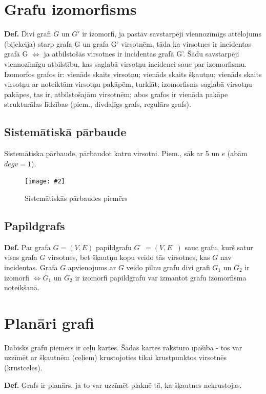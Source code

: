 \documentclass{article}
\newcommand{\illustration}[3]{
	\begin{figure}[H]
		\centering	
		\texttt{[image: \#2]}
		\caption{#3}
	\end{figure}
}
\begin{document}
\section{Grafu izomorfisms}

\textbf{Def.}  Divi grafi $G$ un $G'$ ir izomorfi, ja pastāv savstarpēji viennozīmīgs attēlojums (bijekcija) starp grafa G un grafa G' virsotnēm, tāda ka virsotnes ir incidentas grafā G $\Leftrightarrow$ ja atbilstošās virsotnes ir incidentas grafā G'.  Šādu savstarpēji viennozīmīgu atbilstību, kas saglabā virsotņu incidenci sauc par izomorfismu.  
Izomorfos grafos ir: vienāds skaits virsotņu; vienāds skaits šķautņu; vienāds skaits virsotņu ar noteiktām virsotņu pakāpēm, turklāt; izomorfisms saglabā virsotņu pakāpes, tas ir, atbilstošajām virsotnēm; abos grafos ir vienāda pakāpe strukturālas līdzības (piem., divdaļīgs grafs, regulārs grafs).

\subsection{Sistemātiskā pārbaude}

Sistemātiska pārbaude, pārbaudot katru virsotni. Piem., sāk ar 5 un $e$ (abām $degv=1$).
\illustration{1}{isomorphism-1}{Sistemātiskās pārbaudes piemērs}

\subsection{Papildgrafs}

\textbf{Def.}  Par grafa $G=(V , E )$ papildgrafu $Ḡ = (V , Ē )$ sauc grafu, kurš satur visas grafa $G$ virsotnes, bet šķautņu kopu veido tās virsotnes, kas $G$ nav incidentas.  Grafa $G$ apvienojums ar $G$̄ veido pilnu grafu divi grafi $G_1$ un $G_2$ ir izomorfi $\Leftrightarrow \overline{G}_1 $ un $ \overline{G}_2$ ir izomorfi papildgrafu var izmantot grafu izomorfisma noteikšanā.

\section{Planāri grafi}
Dabisks grafu piemērs ir ceļu kartes. Šādas kartes raksturo īpašība - tos var uzzīmēt ar šķautnēm (ceļiem) krustojoties tikai krustpunktos virsotnēs (krustcelēs).

\textbf{Def.}  Grafs ir planārs, ja to var uzzīmēt plaknē tā, ka šķautnes nekrustojas. 
\end{document}

